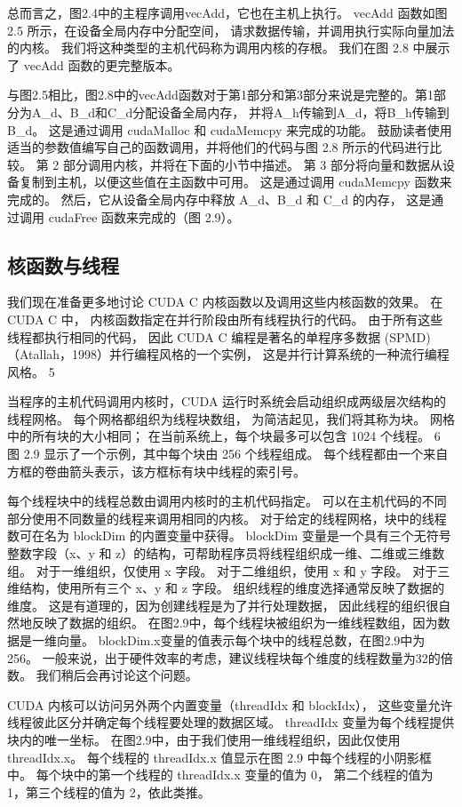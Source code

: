总而言之，图2.4中的主程序调用vecAdd，它也在主机上执行。 vecAdd 函数如图 2.5 所示，在设备全局内存中分配空间，
请求数据传输，并调用执行实际向量加法的内核。 我们将这种类型的主机代码称为调用内核的存根。 
我们在图 2.8 中展示了 vecAdd 函数的更完整版本。

与图2.5相比，图2.8中的vecAdd函数对于第1部分和第3部分来说是完整的。第1部分为A\_d、B\_d和C\_d分配设备全局内存，
并将A\_h传输到A\_d，将B\_h传输到B\_d。 这是通过调用 cudaMalloc 和 cudaMemcpy 来完成的功能。 
鼓励读者使用适当的参数值编写自己的函数调用，并将他们的代码与图 2.8 所示的代码进行比较。 
第 2 部分调用内核，并将在下面的小节中描述。 第 3 部分将向量和数据从设备复制到主机，以便这些值在主函数中可用。 
这是通过调用 cudaMemcpy 函数来完成的。 然后，它从设备全局内存中释放 A\_d、B\_d 和 C\_d 的内存，
这是通过调用 cudaFree 函数来完成的（图 2.9）。

\subsection{核函数与线程}
我们现在准备更多地讨论 CUDA C 内核函数以及调用这些内核函数的效果。 在 CUDA C 中，
内核函数指定在并行阶段由所有线程执行的代码。 由于所有这些线程都执行相同的代码，
因此 CUDA C 编程是著名的单程序多数据 (SPMD)（Atallah，1998）并行编程风格的一个实例，
这是并行计算系统的一种流行编程风格。 5

当程序的主机代码调用内核时，CUDA 运行时系统会启动组织成两级层次结构的线程网格。 每个网格都组织为线程块数组，
为简洁起见，我们将其称为块。 网格中的所有块的大小相同； 在当前系统上，每个块最多可以包含 1024 个线程。 
6 图 2.9 显示了一个示例，其中每个块由 256 个线程组成。 
每个线程都由一个来自方框的卷曲箭头表示，该方框标有块中线程的索引号。

每个线程块中的线程总数由调用内核时的主机代码指定。 可以在主机代码的不同部分使用不同数量的线程来调用相同的内核。 
对于给定的线程网格，块中的线程数可在名为 blockDim 的内置变量中获得。 
blockDim 变量是一个具有三个无符号整数字段（x、y 和 z）的结构，可帮助程序员将线程组织成一维、二维或三维数组。 
对于一维组织，仅使用 x 字段。 对于二维组织，使用 x 和 y 字段。 对于三维结构，使用所有三个 x、y 和 z 字段。 
组织线程的维度选择通常反映了数据的维度。 这是有道理的，因为创建线程是为了并行处理数据，
因此线程的组织很自然地反映了数据的组织。 在图2.9中，每个线程块被组织为一维线程数组，因为数据是一维向量。 
blockDim.x变量的值表示每个块中的线程总数，在图2.9中为256。 
一般来说，出于硬件效率的考虑，建议线程块每个维度的线程数量为32的倍数。 我们稍后会再讨论这个问题。

CUDA 内核可以访问另外两个内置变量（threadIdx 和 blockIdx），
这些变量允许线程彼此区分并确定每个线程要处理的数据区域。 threadIdx 变量为每个线程提供块内的唯一坐标。 
在图2.9中，由于我们使用一维线程组织，因此仅使用threadIdx.x。 
每个线程的 threadIdx.x 值显示在图 2.9 中每个线程的小阴影框中。 每个块中的第一个线程的 threadIdx.x 变量的值为 0，
第二个线程的值为 1，第三个线程的值为 2，依此类推。

